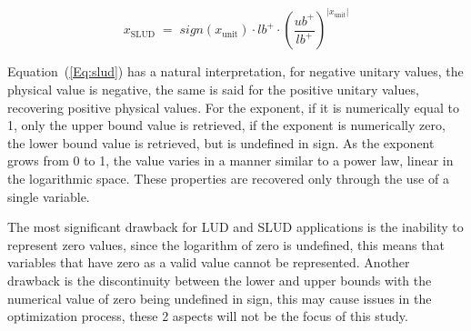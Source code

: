 \documentclass[10pt,fleqn,a4paper,twoside]{article}
\begin{document}
\begin{equation}    
    x_{\mathrm{SLUD}}\;=\; sign(x_{\mathrm{unit}}) \cdot lb^+ \cdot  \left(\frac{ub^+}{lb^+}\right)^{| x_{\mathrm{unit}}|}
    \label{Eq:slud}
\end{equation}

Equation~(\ref{Eq:slud}) has a natural interpretation, for negative unitary values, the physical value is negative, the same is said for the positive unitary values, recovering positive physical values.
For the exponent, if it is numerically equal to 1, only the upper bound value is retrieved, if the exponent is numerically zero, the lower bound value is retrieved, 
but is undefined in sign. As the exponent grows from 0 to 1, the value varies in a manner similar to a power law, linear in the logarithmic space. These properties are recovered only through the use 
of a single variable.

The most significant drawback for LUD and SLUD applications is the inability to represent zero values, since the logarithm of zero
is undefined, this means that variables that have zero as a valid value cannot be represented. Another drawback
is the discontinuity between the lower and upper bounds with the numerical value of zero being undefined in sign,
this may cause issues in the optimization process, these 2 aspects will not be the focus of this study.
\end{document}
